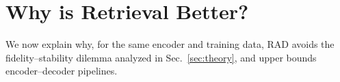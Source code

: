 \documentclass{article}
\theoremstyle{plain}
\theoremstyle{definition}
\theoremstyle{remark}
\begin{document}

\section{Why is Retrieval Better?}
\label{sec:why-retrieval}
We now explain why, for the same encoder and training data, RAD avoids the fidelity--stability dilemma analyzed in Sec.~\ref{sec:theory}, and upper bounds encoder--decoder pipelines.


\end{document}
